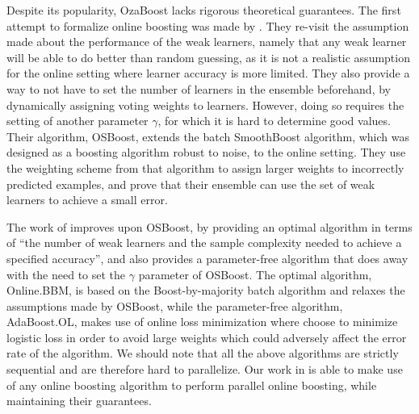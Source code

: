 Despite its popularity, OzaBoost lacks rigorous theoretical guarantees.
The first attempt to formalize online boosting was made by \citet{online-boosting-theoretical}.
They re-visit the assumption made about the performance of the weak
learners, namely that any weak learner will be able to
do better than random guessing, as it is not a realistic assumption
for the online setting where learner accuracy is more limited. They also
provide a way to not have to set the number of learners in the ensemble beforehand,
by dynamically assigning voting weights to learners.
However, doing so requires the setting of another parameter $\gamma$,
for which it is hard to determine good values.
Their algorithm, OSBoost,
extends the batch SmoothBoost \cite{smoothboost} algorithm, which
was designed as a boosting algorithm robust to noise, to the online
setting. They use the weighting scheme from that algorithm to assign
larger weights to incorrectly predicted examples, and prove that
their ensemble can use the set of weak learners to achieve a small
error.

The work of \citet{Beygelzimer2015optimal} improves upon OSBoost,
by providing an optimal algorithm in terms of ``the number of weak learners
and the sample complexity needed to achieve a specified accuracy'', and also provides
a parameter-free algorithm that does away with the need to set the $\gamma$
parameter of OSBoost.
The optimal algorithm, Online.BBM, is based on the Boost-by-majority batch
algorithm \cite{batch-bbm} and relaxes the assumptions made by OSBoost,
while the parameter-free algorithm, AdaBoost.OL, makes use of online
loss minimization where \citeauthor{Beygelzimer2015optimal} choose to minimize logistic loss
in order to avoid large weights which could adversely affect the
error rate of the algorithm.
We should note that all the above algorithms are strictly sequential
and are therefore hard to parallelize.
Our work in \boostvht is able to
make use of any online boosting algorithm to perform
parallel online boosting, while maintaining their guarantees.


